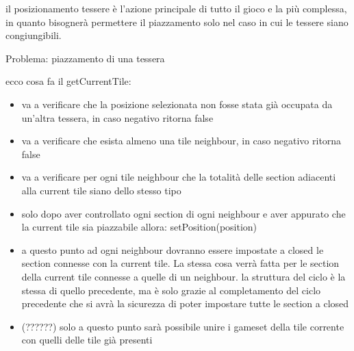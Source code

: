 %
il posizionamento tessere è l'azione principale di tutto il gioco e la più complessa, in quanto bisognerà permettere il piazzamento solo nel caso in cui le tessere siano congiungibili.
%

Problema: piazzamento di una tessera



ecco cosa fa il getCurrentTile:

\begin{itemize}
\item va a verificare che la posizione selezionata non fosse stata già occupata da un’altra tessera, in caso negativo ritorna false
\item va a verificare che esista almeno una tile neighbour, in caso negativo ritorna false
\item va a verificare per ogni tile neighbour che la totalità delle section adiacenti alla current tile siano dello stesso tipo
\item solo dopo aver controllato ogni section di ogni neighbour e aver appurato che la current tile sia piazzabile allora: setPosition(position)
\item a questo punto ad ogni neighbour dovranno essere impostate a closed le section connesse con la current tile. La stessa cosa verrà fatta per le section della current tile connesse a quelle di un neighbour.
\subitem la struttura del ciclo è la stessa di quello precedente, ma è solo grazie al completamento del ciclo precedente che si avrà la sicurezza di poter impostare tutte le section a closed
\item (??????) solo a questo punto sarà possibile unire i gameset della tile corrente con quelli delle tile già presenti
\end{itemize}
